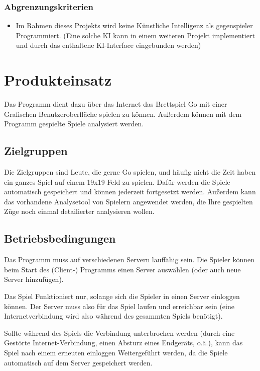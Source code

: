 \subsection{Abgrenzungskriterien}

\begin{itemize}
	\item Im Rahmen dieses Projekts wird keine Künstliche Intelligenz als gegenspieler Programmiert. (Eine solche KI kann in einem weiteren Projekt implementiert und durch das enthaltene KI-Interface eingebunden werden)
\end{itemize}



\chapter{Produkteinsatz}

Das Programm dient dazu über das Internet das Brettspiel Go mit einer Grafischen Benutzeroberfläche spielen zu können. Außerdem können mit dem Programm gespielte Spiele analysiert werden.


\section{Zielgruppen}

Die Zielgruppen sind Leute, die gerne Go spielen, und häufig nicht die Zeit haben ein ganzes Spiel auf einem 19x19 Feld zu spielen. Dafür werden die Spiele automatisch gespeichert und können jederzeit fortgesetzt werden.
Außerdem kann das vorhandene Analysetool von Spielern angewendet werden, die Ihre gespielten Züge noch einmal detailierter analysieren wollen.


\section{Betriebsbedingungen}

Das Programm muss auf verschiedenen Servern lauffähig sein. Die Spieler können beim Start des (Client-) Programms einen Server auswählen (oder auch neue Server hinzufügen).

Das Spiel Funktioniert nur, solange sich die Spieler in einen Server einloggen können. Der Server muss also für das Spiel laufen und erreichbar sein (eine Internetverbindung wird also während des gesammten Spiels benötigt).

Sollte während des Spiels die Verbindung unterbrochen werden (durch eine Gestörte Internet-Verbindung, einen Absturz eines Endgeräts, o.ä.), kann das Spiel nach einem erneuten einloggen Weitergeführt werden, da die Spiele automatisch auf dem Server gespeichert werden.

